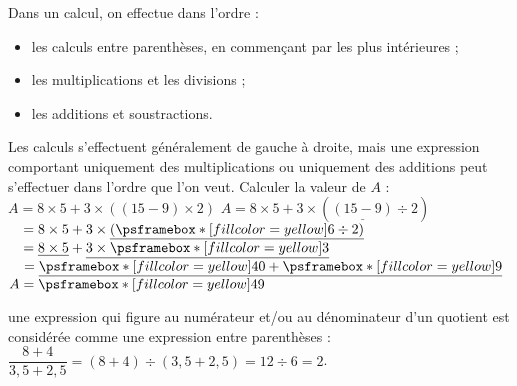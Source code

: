 
\bigskip

\begin{methode}
   Dans un calcul, on effectue dans l'ordre :
   \begin{itemize}
      \item les calculs entre parenthèses, en commençant par les plus intérieures ;
      \item les multiplications et les divisions ;
      \item les additions et soustractions.
   \end{itemize}
   Les calculs s'effectuent généralement de gauche à droite, mais une expression comportant uniquement des multiplications
   ou uniquement des additions peut s'effectuer dans l'ordre que l'on veut.
   \exercice
      Calculer la valeur de $A$ : \\
      $A =8\times5+3\times((15-9)\times2)$
   \correction
      $A =8\times5+3\times(\underline{(15-9)}\div2)$ \\
      $\phantom{A} =8\times5+3\times\underline{(\psframebox*[fillcolor=yellow]{6}\div2)}$ \\
      $\phantom{A} =\underline{8\times5}+\underline{3\times\psframebox*[fillcolor=yellow]{3}}$ \\
      $\phantom{A} =\underline{\psframebox*[fillcolor=yellow]{40}+\psframebox*[fillcolor=yellow]{9}}$ \\
      $A = \psframebox*[fillcolor=yellow]{49}$
\end{methode}

\begin{remarque}
   une expression qui figure au numérateur et/ou au dénominateur d'un quotient est considérée comme une expression entre parenthèses : \\
   $\dfrac{8+4}{3,5+2,5} = (8+4)\div(3,5+2,5) =12\div6 =2$.
\end{remarque}